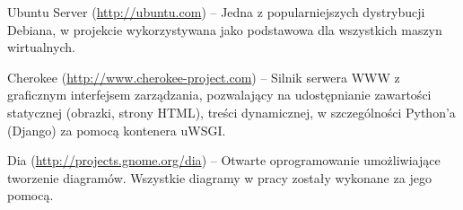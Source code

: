 \begin{minipage}{\textwidth}
\begin{packed_item}
        \item{Ubuntu Server (\url{http://ubuntu.com}) -- Jedna z popularniejszych dystrybucji Debiana, w projekcie wykorzystywana jako podstawowa dla wszystkich maszyn wirtualnych.}
        \item{Cherokee (\url{http://www.cherokee-project.com}) -- Silnik serwera WWW z graficznym interfejsem zarządzania, pozwalający na udostępnianie zawartości statycznej (obrazki, strony HTML), treści dynamicznej, w szczególności Python'a (Django) za pomocą kontenera uWSGI.}
        \item{Dia (\url{http://projects.gnome.org/dia}) -- Otwarte oprogramowanie umożliwiające tworzenie diagramów. Wszystkie diagramy w pracy zostały wykonane za jego pomocą.}
    \end{packed_item}
\end{minipage}

\newpage
